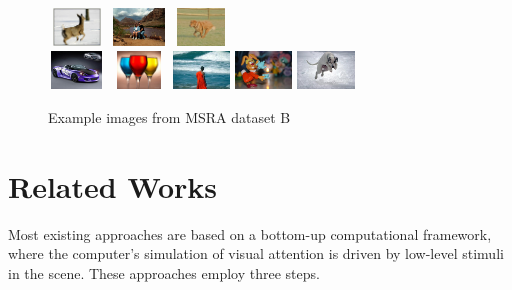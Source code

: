 \documentclass[10pt,twocolumn,letterpaper]{article}
\begin{document}
\begin{figure}[h]
\begin{center}
    \includegraphics[width=0.6in,height=0.4in]{./Figures/example_image/4_139_139245.jpg}
    \includegraphics[width=0.6in,height=0.4in]{./Figures/example_image/4_139_139680.jpg}
    \includegraphics[width=0.6in,height=0.4in]{./Figures/example_image/4_140_140285.jpg}\\
    \includegraphics[width=0.6in,height=0.4in]{./Figures/example_image/4_142_142916.jpg}
    \includegraphics[width=0.6in,height=0.4in]{./Figures/example_image/4_143_143262.jpg}
    \includegraphics[width=0.6in,height=0.4in]{./Figures/example_image/4_144_144604.jpg}
    \includegraphics[width=0.6in,height=0.4in]{./Figures/example_image/4_134_134777.jpg}
    \includegraphics[width=0.6in,height=0.4in]{./Figures/example_image/4_134_134664.jpg}\\
    \caption{Example images from MSRA dataset B}
    \end{center}
\end{figure}

\section{Related Works}
Most existing approaches are based on a bottom-up computational framework, where the computer's simulation of visual attention is driven by low-level stimuli in the scene.  %
These approaches employ three steps.
\end{document}
